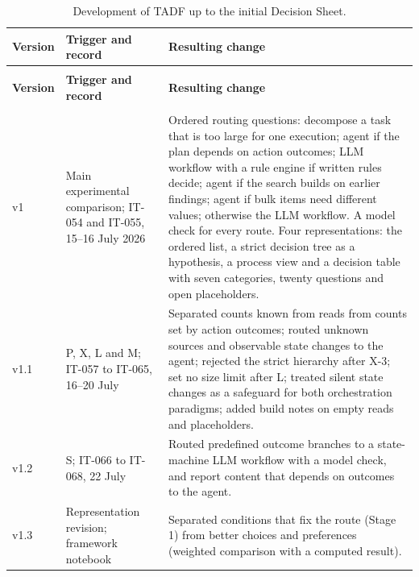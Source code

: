 \begingroup
\renewcommand{\baselinestretch}{1}
\small
\setlength{\tabcolsep}{4pt}
\renewcommand{\arraystretch}{1.08}
\begin{longtable}{>{\raggedright\arraybackslash}p{} >{\raggedright\arraybackslash}p{} >{\raggedright\arraybackslash}p{}}
\caption[Development of TADF up to the initial Decision Sheet]{Development of TADF up to the initial Decision Sheet.}\label{tab:evolution} \\
\toprule
\textbf{Version} & \textbf{Trigger and record} & \textbf{Resulting change} \\
\midrule
\endfirsthead
\multicolumn{3}{l}{\tablename~\thetable{} (continued)} \\
\toprule
\textbf{Version} & \textbf{Trigger and record} & \textbf{Resulting change} \\
\midrule
\endhead
\midrule
\multicolumn{3}{r}{\emph{Continued on the next page.}} \\
\endfoot
\bottomrule
\endlastfoot
v1 & Main experimental comparison; IT-054 and IT-055, 15--16 July 2026 & Ordered routing questions: decompose a task that is too large for one execution; agent if the plan depends on action outcomes; LLM workflow with a rule engine if written rules decide; agent if the search builds on earlier findings; agent if bulk items need different values; otherwise the LLM workflow. A model check for every route. Four representations: the ordered list, a strict decision tree as a hypothesis, a process view and a decision table with seven categories, twenty questions and open placeholders. \\
\addlinespace[2.5pt]
v1.1 & P, X, L and M; IT-057 to IT-065, 16--20 July & Separated counts known from reads from counts set by action outcomes; routed unknown sources and observable state changes to the agent; rejected the strict hierarchy after X-3; set no size limit after L; treated silent state changes as a safeguard for both orchestration paradigms; added build notes on empty reads and placeholders. \\
\addlinespace[2.5pt]
v1.2 & S; IT-066 to IT-068, 22 July & Routed predefined outcome branches to a state-machine LLM workflow with a model check, and report content that depends on outcomes to the agent. \\
\addlinespace[2.5pt]
v1.3 & Representation revision; framework notebook & Separated conditions that fix the route (Stage 1) from better choices and preferences (weighted comparison with a computed result). \\

\end{longtable}
